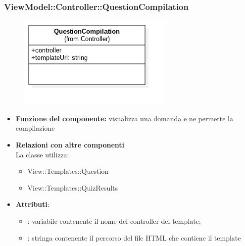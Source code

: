  \subsubsection{ViewModel::Controller::QuestionCompilation}
 \begin{figure}[h!]
\begin{center}
	\includegraphics[scale=0.4]{../images/ViewModel/Controller/QuestionCompilation.png}
\end{center}
\end{figure}
 \begin{itemize}
 \item\textbf{Funzione del componente:} visualizza una domanda e ne permette la compilazione
 \item\textbf{Relazioni con altre componenti}\\
 La classe utilizza:
 	\begin{itemize}
 		\item View::Templates::Question
 		\item View::Templates::QuizResults
 	\end{itemize}
 \item\textbf{Attributi}:
 	\begin{itemize}
 		\item{}: variabile contenente il nome del controller del template;\\
		
		\item{}: stringa contenente il percorso del file HTML che contiene il template\\
 	\end{itemize}
 \end{itemize}
\newpage
 
